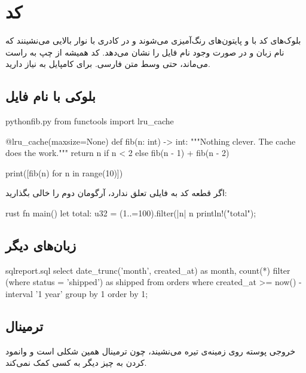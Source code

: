\chapter{کد}

بلوک‌های کد با  و پایتون‌های  رنگ‌آمیزی می‌شوند و در
کادری با نوار بالایی می‌نشینند که نام زبان و در صورت وجود نام فایل را نشان
می‌دهد. کد همیشه از چپ به راست می‌ماند، حتی وسط متن فارسی. برای کامپایل به
 نیاز دارید.

\section{بلوکی با نام فایل}

\begin{code}{python}{fib.py}
from functools import lru_cache

@lru_cache(maxsize=None)
def fib(n: int) -> int:
    """Nothing clever. The cache does the work."""
    return n if n < 2 else fib(n - 1) + fib(n - 2)

print([fib(n) for n in range(10)])
\end{code}

اگر قطعه کد به فایلی تعلق ندارد، آرگومان دوم را خالی بگذارید:

\begin{code}{rust}{}
fn main() {
    let total: u32 = (1..=100).filter(|n| n %
    println!("{total}");
}
\end{code}

\section{زبان‌های دیگر}

\begin{code}{sql}{report.sql}
select
  date_trunc('month', created_at) as month,
  count(*) filter (where status = 'shipped') as shipped
from orders
where created_at >= now() - interval '1 year'
group by 1
order by 1;
\end{code}

\section{ترمینال}

خروجی پوسته روی زمینه‌ی تیره می‌نشیند، چون ترمینال همین شکلی است و وانمود
کردن به چیز دیگر به کسی کمک نمی‌کند.


